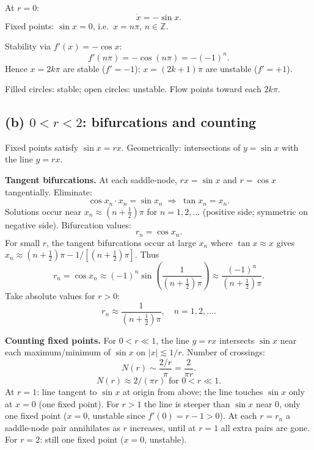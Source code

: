 \documentclass[11pt]{article}
\begin{document}
At $r=0$:
\[ \dot x = -\sin x. \]
Fixed points: $\sin x = 0$, i.e.\ $x = n\pi$, $n\in\mathbb Z$.

Stability via $f'(x) = -\cos x$:
\[ f'(n\pi) = -\cos(n\pi) = -(-1)^n. \]
Hence $x=2k\pi$ are stable ($f'=-1$); $x=(2k+1)\pi$ are unstable ($f'=+1$).

\begin{center}
\end{center}
Filled circles: stable; open circles: unstable. Flow points toward each $2k\pi$.

\subsection*{(b) $0<r<2$: bifurcations and counting}

Fixed points satisfy $\sin x = rx$. Geometrically: intersections of $y=\sin x$ with the line $y=rx$.

\textbf{Tangent bifurcations.} At each saddle-node, $rx = \sin x$ and $r = \cos x$ tangentially. Eliminate:
\[ \cos x_n\cdot x_n = \sin x_n \;\Rightarrow\; \tan x_n = x_n. \]
Solutions occur near $x_n \approx (n+\tfrac{1}{2})\pi$ for $n=1,2,\dots$ (positive side; symmetric on negative side). Bifurcation values:
\[ r_n = \cos x_n. \]
For small $r$, the tangent bifurcations occur at large $x_n$ where $\tan x \approx x$ gives $x_n \approx (n+\tfrac{1}{2})\pi - 1/[(n+\tfrac{1}{2})\pi]$. Thus
\[ r_n = \cos x_n \approx (-1)^n\sin\!\left(\frac{1}{(n+\tfrac{1}{2})\pi}\right) \approx \frac{(-1)^n}{(n+\tfrac{1}{2})\pi}. \]
Take absolute values for $r>0$:
\[ \boxed{\;r_n \approx \frac{1}{(n+\tfrac{1}{2})\pi},\quad n=1,2,\dots.\;} \]

\textbf{Counting fixed points.} For $0<r\ll 1$, the line $y=rx$ intersects $\sin x$ near each maximum/minimum of $\sin x$ on $|x|\lesssim 1/r$. Number of crossings:
\[ N(r) \sim \frac{2/r}{\pi} = \frac{2}{\pi r}. \]
\[ \boxed{\;N(r) \approx 2/(\pi r) \text{ for } 0<r\ll 1.\;} \]
At $r=1$: line tangent to $\sin x$ at origin from above; the line touches $\sin x$ only at $x=0$ (one fixed point). For $r>1$ the line is steeper than $\sin x$ near $0$, only one fixed point ($x=0$, unstable since $f'(0)=r-1>0$). At each $r=r_n$ a saddle-node pair annihilates as $r$ increases, until at $r=1$ all extra pairs are gone. For $r=2$: still one fixed point ($x=0$, unstable).
\end{document}
